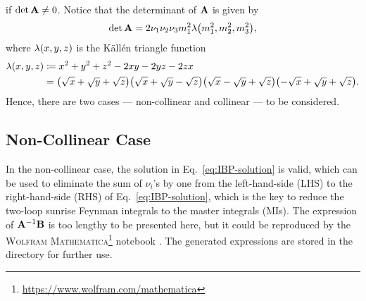 \documentclass{article}
\begin{document}
        if $\det \vb{A} \neq 0$.
        Notice that the determinant of $\vb{A}$ is given by
        \begin{equation}
            \det \vb{A} = 2 \nu_1 \nu_2 \nu_3 m_1^2 \lambdaFun{m_1^2, m_2^2, m_3^2},
            \label{eq:det-A}
        \end{equation}
        where $\lambdaFun{x, y, z}$ is the Källén triangle function \cite[Eq.~(6.3)--(6.7)]{Byckling:1971ParticleKinematics}
        \begin{equation}
            \begin{aligned}
                \lambdaFun{x, y, z} & \coloneq x^2 + y^2 + z^2 - 2 x y - 2 y z - 2 z x \\
                & = \qty(\sqrt{x} + \sqrt{y} + \sqrt{z}) \qty(\sqrt{x} + \sqrt{y} - \sqrt{z}) \qty(\sqrt{x} - \sqrt{y} + \sqrt{z}) \qty(-\sqrt{x} + \sqrt{y} + \sqrt{z}).
            \end{aligned}
            \label{eq:Kallen-triangle}
        \end{equation}
        Hence, there are two cases --- non-collinear and collinear --- to be considered.

        \subsection{Non-Collinear Case}

            In the non-collinear case, the solution in Eq.~\eqref{eq:IBP-solution} is valid, which can be used to eliminate the sum of $\nu_i$'s by one from the left-hand-side (LHS) to the right-hand-side (RHS) of Eq.~\eqref{eq:IBP-solution}, which is the key to reduce the two-loop sunrise Feynman integrals to the master integrals (MIs).
            The expression of $\vb{A}^{-1} \vb{B}$ is too lengthy to be presented here, but it could be reproduced by the \textsc{Wolfram Mathematica}\footnote{\url{https://www.wolfram.com/mathematica}} notebook .
            The generated expressions are stored in the directory  for further use.
\end{document}
